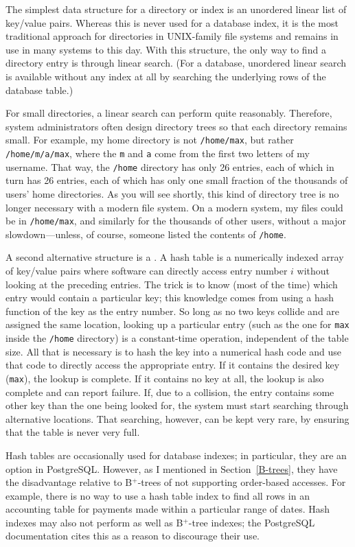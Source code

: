 The simplest data structure for a directory or index is an unordered
linear list of key/value pairs.  Whereas this is never used for a
database index, it is the most traditional approach for directories in
UNIX-family file systems and remains in use in many systems to this
day.  With this structure, the only way to find a directory entry is
through linear search. (For a database, unordered linear search is
available without any index at all by searching the underlying
rows of the database table.)

For small directories, a linear search can perform quite reasonably.
Therefore, system administrators often design directory trees so that
each directory remains small.  For example, my home directory is not
\verb|/home/max|, but rather
\verb|/home/m/a/max|, where the \verb|m| and \verb|a| come from the
first two letters of my username.  That way, the \verb|/home|
directory has only 26 entries, each of which in turn has 26
entries, each of which has only one small fraction of the thousands of
users' home directories.  As you will see shortly, this kind of directory
tree is no longer necessary with a modern file system.  On a modern
system, my files could be in \verb|/home/max|, and similarly for the
thousands of other users, without a major slowdown---unless, of
course, someone listed the contents of \verb|/home|.

A second alternative structure is a .  A hash table is a
numerically indexed array of key/value pairs where software can directly
access entry number $i$ without looking at the preceding entries.  The
trick is to know (most of the time) which entry would contain a
particular key; this knowledge comes from using a hash function of the key as the entry
number.  So long as no two keys collide and are assigned the same
location, looking up a particular entry (such as the one
for \verb|max| inside the
\verb|/home| directory) is a constant-time operation,
independent of the table size. All that is necessary is to hash the
key into a numerical hash code and use that code to directly access
the appropriate entry.  If it contains the desired key (\verb|max|),
the lookup is complete.  If it contains no key at all, the lookup is
also complete and can report failure.  If, due to a collision, the
entry contains some other key than the one being looked for, the
system must start searching through alternative locations.  That
searching, however, can be kept very rare, by ensuring that the table
is never very full.

Hash tables are occasionally used for database indexes; in particular,
they are an option in PostgreSQL.  However, as I mentioned in Section~\ref{B-trees},
they have the disadvantage relative to B${}^+$-trees of not supporting
order-based accesses.  For example, there is no way to use a hash
table index to find all rows in an accounting table for payments made
within a particular range of dates.  Hash indexes may also not perform
as well as B${}^+$-tree indexes; the PostgreSQL documentation cites this as
a reason to discourage their use.

